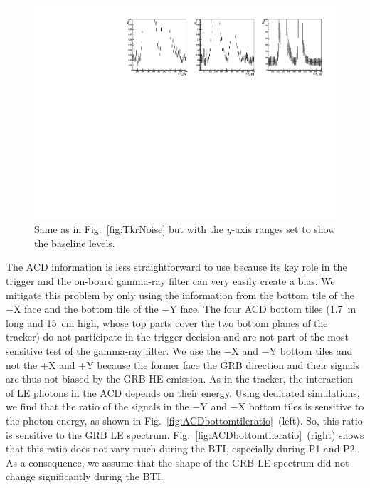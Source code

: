 \documentclass[preprint]{aastex631}
\begin{document}
\begin{figure}[t]
    \centering
    \includegraphics[width=0.9\linewidth]{paper_showcheckTkrNoiseInCorner_zoom.pdf}
    \caption{Same as in Fig.~\ref{fig:TkrNoise} but with the $y$-axis ranges set to show the baseline levels.}
    \label{fig:TkrNoiseZoom}
\end{figure}

The ACD information is less straightforward to use because its key role in the trigger and the on-board gamma-ray filter can very easily create a bias. We mitigate this problem by only using the information from the bottom tile of the $-$X face and the bottom tile of the $-$Y face. The four ACD bottom tiles (1.7~m long and 15~cm high, whose top parts cover the two bottom planes of the tracker) do not participate in the trigger decision and are not part of the most sensitive test of the gamma-ray filter. We use the $-$X and $-$Y bottom tiles and not the +X and +Y because the former face the GRB direction and their signals are thus not biased by the GRB HE emission. As in the tracker, the interaction of LE photons in the ACD depends on their energy. Using dedicated simulations, we find that the ratio of the signals in the $-$Y and $-$X bottom tiles is sensitive to the photon energy, as shown in Fig.~\ref{fig:ACDbottomtileratio}~(left). So, this ratio is sensitive to the GRB LE spectrum. Fig.~\ref{fig:ACDbottomtileratio}~(right) shows that this ratio does not vary much during the BTI, especially during P1 and P2. As a consequence, we assume that the shape of the GRB LE spectrum did not change significantly during the BTI.
\end{document}

